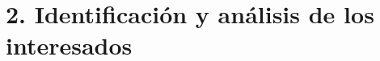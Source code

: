 \documentclass[
11pt, %
codirector, %
]{charter}
\begin{document}
\section{2. Identificación y análisis de los interesados}
\label{sec:interesados}

 
 



\end{document}
